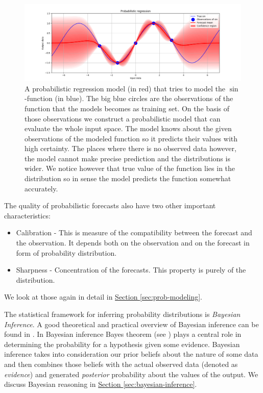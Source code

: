 \documentclass[12pt,a4paper,twoside]{scrartcl}
\numberwithin{equation}{section}
\newcommand{\refsec}[1]{\hyperref[#1]{Section \ref*{#1}}}
\begin{document}
\begin{center}
  \begin{figure}[htbp]
    \label{fig:prob-regression}
    \centering
    \includegraphics[height=0.5\textwidth, width=1\textwidth]{figures/probabilistic_regression.png}
    \caption[Probabilistic regression example model]{A probabilistic regression model (in red) that tries to model the \(\sin\)-function (in blue). The big blue circles are the observations of the function that the models becomes as training set. On the basis of those observations we construct a probabilistic model that can evaluate the whole input space. The model knows about the given observations of the modeled function so it predicts their values with high certainty. The places where there is no observed data however, the model cannot make precise prediction and the distributions is wider. We notice however that true value of the function lies in the distribution so in sense the model predicts the function somewhat accurately. } 
  \end{figure}
\end{center}

The quality of probabilistic forecasts also have two other important characteristics:
\begin{itemize}
\item Calibration - This is measure of the compatibility between the forecast and the observation. It depends both on the observation and on the  forecast in form of probability distribution.
\item Sharpness - Concentration of the forecasts. This property is purely of the distribution.
\end{itemize}
We look at those again in detail in \refsec{sec:prob-modeling}.

The statistical framework for inferring probability distributions is \emph{Bayesian Inference}. A good theoretical and practical overview of Bayesian inference can be found in \cite{tipping2004}. In Bayesian inference Bayes theorem (see \cite{bayes63}) plays a central role in determining the probability for a hypothesis given some evidence. Bayesian inference takes into consideration our prior beliefs about the nature of some data and then combines those beliefs with the actual observed data (denoted as \emph{evidence}) and generated \emph{posterior} probability about the values of the output. We discuss Bayesian reasoning in \refsec{sec:bayesian-inference}.
\end{document}
